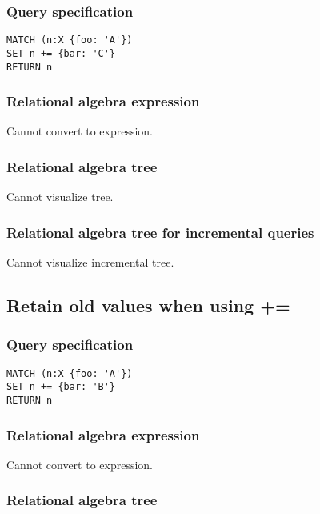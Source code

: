 \subsubsection*{Query specification}

\begin{lstlisting}
MATCH (n:X {foo: 'A'})
SET n += {bar: 'C'}
RETURN n
\end{lstlisting}

\subsubsection*{Relational algebra expression}

Cannot convert to expression.

\subsubsection*{Relational algebra tree}

Cannot visualize tree.

\subsubsection*{Relational algebra tree for incremental queries}

Cannot visualize incremental tree.

\subsection{Retain old values when using +=}

\subsubsection*{Query specification}

\begin{lstlisting}
MATCH (n:X {foo: 'A'})
SET n += {bar: 'B'}
RETURN n
\end{lstlisting}

\subsubsection*{Relational algebra expression}

Cannot convert to expression.

\subsubsection*{Relational algebra tree}

